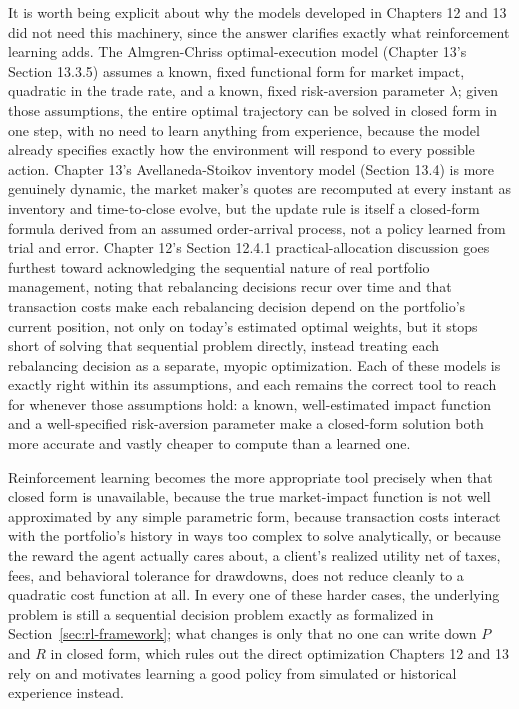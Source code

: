 \documentclass[../ai_in_finance]{subfiles}
\begin{document}
It is worth being explicit about why the models developed in Chapters 12 and 13 did not need this machinery, since the answer clarifies exactly what reinforcement learning adds. The Almgren-Chriss optimal-execution model (Chapter 13's Section 13.3.5) assumes a known, fixed functional form for market impact, quadratic in the trade rate, and a known, fixed risk-aversion parameter $\lambda$; given those assumptions, the entire optimal trajectory can be solved in closed form in one step, with no need to learn anything from experience, because the model already specifies exactly how the environment will respond to every possible action. Chapter 13's Avellaneda-Stoikov inventory model (Section 13.4) is more genuinely dynamic, the market maker's quotes are recomputed at every instant as inventory and time-to-close evolve, but the update rule is itself a closed-form formula derived from an assumed order-arrival process, not a policy learned from trial and error. Chapter 12's Section 12.4.1 practical-allocation discussion goes furthest toward acknowledging the sequential nature of real portfolio management, noting that rebalancing decisions recur over time and that transaction costs make each rebalancing decision depend on the portfolio's current position, not only on today's estimated optimal weights, but it stops short of solving that sequential problem directly, instead treating each rebalancing decision as a separate, myopic optimization. Each of these models is exactly right within its assumptions, and each remains the correct tool to reach for whenever those assumptions hold: a known, well-estimated impact function and a well-specified risk-aversion parameter make a closed-form solution both more accurate and vastly cheaper to compute than a learned one.

Reinforcement learning becomes the more appropriate tool precisely when that closed form is unavailable, because the true market-impact function is not well approximated by any simple parametric form, because transaction costs interact with the portfolio's history in ways too complex to solve analytically, or because the reward the agent actually cares about, a client's realized utility net of taxes, fees, and behavioral tolerance for drawdowns, does not reduce cleanly to a quadratic cost function at all. In every one of these harder cases, the underlying problem is still a sequential decision problem exactly as formalized in Section~\ref{sec:rl-framework}; what changes is only that no one can write down $P$ and $R$ in closed form, which rules out the direct optimization Chapters 12 and 13 rely on and motivates learning a good policy from simulated or historical experience instead.
\end{document}
